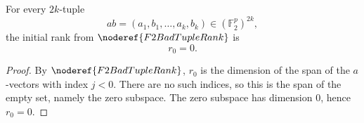 \begin{helper}
For every \(2k\)-tuple
\[
  ab=(a_1,b_1,\ldots,a_k,b_k)\in(\mathbb F_2^p)^{2k},
\]
the initial rank from \(\noderef{F2BadTupleRank}\) is
\[
  r_0=0.
\]
\end{helper}
\begin{proof}
By \(\noderef{F2BadTupleRank}\), \(r_0\) is the dimension of the span of the
\(a\)-vectors with index \(j<0\). There are no such indices, so this is the span
of the empty set, namely the zero subspace. The zero subspace has dimension
\(0\), hence \(r_0=0\).
\end{proof}

